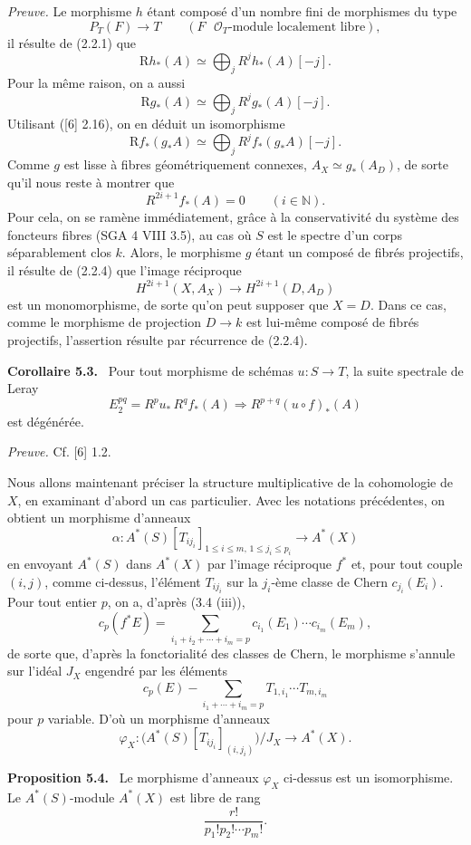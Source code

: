 \documentclass[11pt]{article}
\newenvironment{statement}[1]{\par\medskip\noindent\textbf{#1.}\ }{\par\medskip}
\begin{document}
\emph{Preuve.} Le morphisme $h$ étant composé d'un nombre fini de morphismes du type
\[
P_T(F)\to T\qquad (F\text{ }\mathcal O_T\text{-module localement libre}),
\tag{Q}
\]
il résulte de (2.2.1) que
\[
\mathrm Rh_*(A)\simeq\bigoplus_j R^jh_*(A)[-j].
\]
Pour la même raison, on a aussi
\[
\mathrm Rg_*(A)\simeq\bigoplus_j R^jg_*(A)[-j].
\]
Utilisant ([6] 2.16), on en déduit un isomorphisme
\[
\mathrm Rf_*(g_*A)\simeq\bigoplus_j R^j f_*(g_*A)[-j].
\]
Comme $g$ est lisse à fibres géométriquement connexes, $A_X\simeq g_*(A_D)$, de sorte qu'il nous reste à montrer que
\[
R^{2i+1}f_*(A)=0\qquad (i\in\mathbb N).
\tag{5.2.1}
\]
Pour cela, on se ramène immédiatement, grâce à la conservativité du système des foncteurs fibres (SGA 4 VIII 3.5), au cas où $S$ est le spectre d'un corps séparablement clos $k$. Alors, le morphisme $g$ étant un composé de fibrés projectifs, il résulte de (2.2.4) que l'image réciproque
\[
H^{2i+1}(X,A_X)\to H^{2i+1}(D,A_D)
\]
est un monomorphisme, de sorte qu'on peut supposer que $X=D$. Dans ce cas, comme le morphisme de projection $D\to k$ est lui-même composé de fibrés projectifs, l'assertion résulte par récurrence de (2.2.4).

\begin{statement}{Corollaire 5.3}
Pour tout morphisme de schémas $u:S\to T$, la suite spectrale de Leray
\[
E_2^{pq}=R^p u_*\,R^q f_*(A)\Rightarrow R^{p+q}(u\circ f)_*(A)
\]
est dégénérée.
\end{statement}

\emph{Preuve.} Cf. [6] 1.2.

Nous allons maintenant préciser la structure multiplicative de la cohomologie de $X$, en examinant d'abord un cas particulier. Avec les notations précédentes, on obtient un morphisme d'anneaux
\[
\alpha:A^*(S)[T_{ij_i}]_{1\le i\le m,\,1\le j_i\le p_i}\to A^*(X)
\]
en envoyant $A^*(S)$ dans $A^*(X)$ par l'image réciproque $f^*$ et, pour tout couple $(i,j)$, comme ci-dessus, l'élément $T_{ij_i}$ sur la $j_i$-ème classe de Chern $c_{j_i}(E_i)$. Pour tout entier $p$, on a, d'après (3.4 (iii)),
\[
c_p(f^*E)=\sum_{i_1+i_2+\cdots+i_m=p}c_{i_1}(E_1)\cdots c_{i_m}(E_m),
\]
de sorte que, d'après la fonctorialité des classes de Chern, le morphisme s'annule sur l'idéal $J_X$ engendré par les éléments
\[
c_p(E)-\sum_{i_1+\cdots+i_m=p}T_{1,i_1}\cdots T_{m,i_m}
\]
pour $p$ variable. D'où un morphisme d'anneaux
\[
\varphi_X:\bigl(A^*(S)[T_{ij_i}]_{(i,j_i)}\bigr)/J_X\to A^*(X).
\]

\begin{statement}{Proposition 5.4}
Le morphisme d'anneaux $\varphi_X$ ci-dessus est un isomorphisme. Le $A^*(S)$-module $A^*(X)$ est libre de rang
\[
\frac{r!}{p_1!p_2!\cdots p_m!}.
\]
\end{statement}
\end{document}
